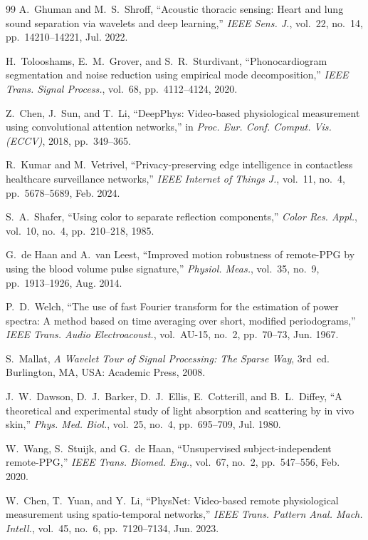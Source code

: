 \documentclass[journal]{IEEEtran}
\begin{document}
\begin{thebibliography}{99}
A.~Ghuman and M.~S.~Shroff,
``Acoustic thoracic sensing: Heart and lung sound separation via wavelets and deep learning,''
\emph{IEEE Sens. J.}, vol.~22, no.~14, pp.~14210--14221, Jul. 2022.

H.~Tolooshams, E.~M.~Grover, and S.~R.~Sturdivant,
``Phonocardiogram segmentation and noise reduction using empirical mode decomposition,''
\emph{IEEE Trans. Signal Process.}, vol.~68, pp.~4112--4124, 2020.

Z.~Chen, J.~Sun, and T.~Li,
``DeepPhys: Video-based physiological measurement using convolutional attention networks,''
in \emph{Proc. Eur. Conf. Comput. Vis. (ECCV)}, 2018, pp.~349--365.

R.~Kumar and M.~Vetrivel,
``Privacy-preserving edge intelligence in contactless healthcare surveillance networks,''
\emph{IEEE Internet of Things J.}, vol.~11, no.~4, pp.~5678--5689, Feb. 2024.

S.~A.~Shafer,
``Using color to separate reflection components,''
\emph{Color Res. Appl.}, vol.~10, no.~4, pp.~210--218, 1985.

G.~de Haan and A.~van Leest,
``Improved motion robustness of remote-PPG by using the blood volume pulse signature,''
\emph{Physiol. Meas.}, vol.~35, no.~9, pp.~1913--1926, Aug. 2014.

P.~D.~Welch,
``The use of fast Fourier transform for the estimation of power spectra: A method based on time averaging over short, modified periodograms,''
\emph{IEEE Trans. Audio Electroacoust.}, vol.~AU-15, no.~2, pp.~70--73, Jun. 1967.

S.~Mallat,
\emph{A Wavelet Tour of Signal Processing: The Sparse Way}, 3rd~ed. Burlington, MA, USA: Academic Press, 2008.

J.~W.~Dawson, D.~J.~Barker, D.~J.~Ellis, E.~Cotterill, and B.~L.~Diffey,
``A theoretical and experimental study of light absorption and scattering by in vivo skin,''
\emph{Phys. Med. Biol.}, vol.~25, no.~4, pp.~695--709, Jul. 1980.

W.~Wang, S.~Stuijk, and G.~de Haan,
``Unsupervised subject-independent remote-PPG,''
\emph{IEEE Trans. Biomed. Eng.}, vol.~67, no.~2, pp.~547--556, Feb. 2020.

W.~Chen, T.~Yuan, and Y.~Li,
``PhysNet: Video-based remote physiological measurement using spatio-temporal networks,''
\emph{IEEE Trans. Pattern Anal. Mach. Intell.}, vol.~45, no.~6, pp.~7120--7134, Jun. 2023.


\end{thebibliography}
\end{document}
